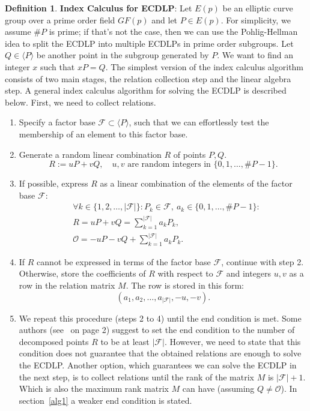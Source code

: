 \documentclass[thesis=M,english]{FITthesis}[2012/10/20]
\theoremstyle{remark}
\theoremstyle{definition}
\newtheorem{DF}{Definition}[section]
\begin{document}
\begin{DF}
\textbf{Index Calculus for ECDLP}: Let $E(p)$ be an elliptic curve group over a prime order field $GF(p)$ and  let $P \in E(p)$. For simplicity, we assume $\#P$ is prime; if that's not the case, then we can use the Pohlig-Hellman idea to split the ECDLP into multiple ECDLPs in prime order subgroups. Let $Q \in \langle P \rangle$ be another point in the subgroup generated by $P$. We want to find an integer $x$ such that $xP = Q$. The simplest version of the index calculus algorithm consists of two main stages, the relation collection step and the linear algebra step. A general index calculus algorithm for solving the ECDLP is described below. First, we need to collect relations.
\begin{enumerate}
\item Specify a factor base $\mathcal{F} \subset \langle P \rangle$, such that we can effortlessly test the membership of an element to this factor base. 
\item Generate a random linear combination $R$ of points $P,Q$.
$$
R := uP + vQ,\quad \text{$u,v$ are random integers in $\{0,1,\ldots ,\#P - 1\}$}.
$$
\item If possible, express $R$ as a linear combination of the elements of the factor base $\mathcal{F}$:
\begin{align*}
&\forall k \in \{1,2,\ldots,|\mathcal{F}|\}: P_k \in \mathcal{F},\ a_k \in \{0,1,\ldots ,\#P - 1\}: \\
&R = uP + vQ = \sum_{k=1}^{|\mathcal{F}|}a_k P_k, \\
&\mathcal{O} = -uP - vQ + \sum_{k=1}^{|\mathcal{F}|}a_k P_k.
\end{align*}
\item If $R$ cannot be expressed in terms of the factor base $\mathcal{F}$, continue with step 2. Otherwise, store the coefficients of $R$ with respect to $\mathcal{F}$ and integers $u,v$ as a row in the relation matrix $M$. The row is stored in this form:
$$
(a_1, a_2, \ldots, a_{|\mathcal{F}|}, -u, -v).
$$
\item We repeat this procedure (steps 2 to 4) until the end condition is met.
\noindent Some authors (see~\cite{amadori17} on page 2) suggest to set the end condition to the number of decomposed points $R$ to be at least $|\mathcal{F}|$. However, we need to state that this condition does not guarantee that the obtained relations are enough to solve the ECDLP. Another option, which guarantees we can solve the ECDLP in the next step, is to collect relations until the rank of the matrix $M$ is $|\mathcal{F}| + 1$. Which is also the maximum rank matrix $M$ can have (assuming $Q \neq \mathcal{O}$).  In section~\ref{alg1} a weaker end condition is stated.

\end{enumerate}
\end{DF}
\end{document}
